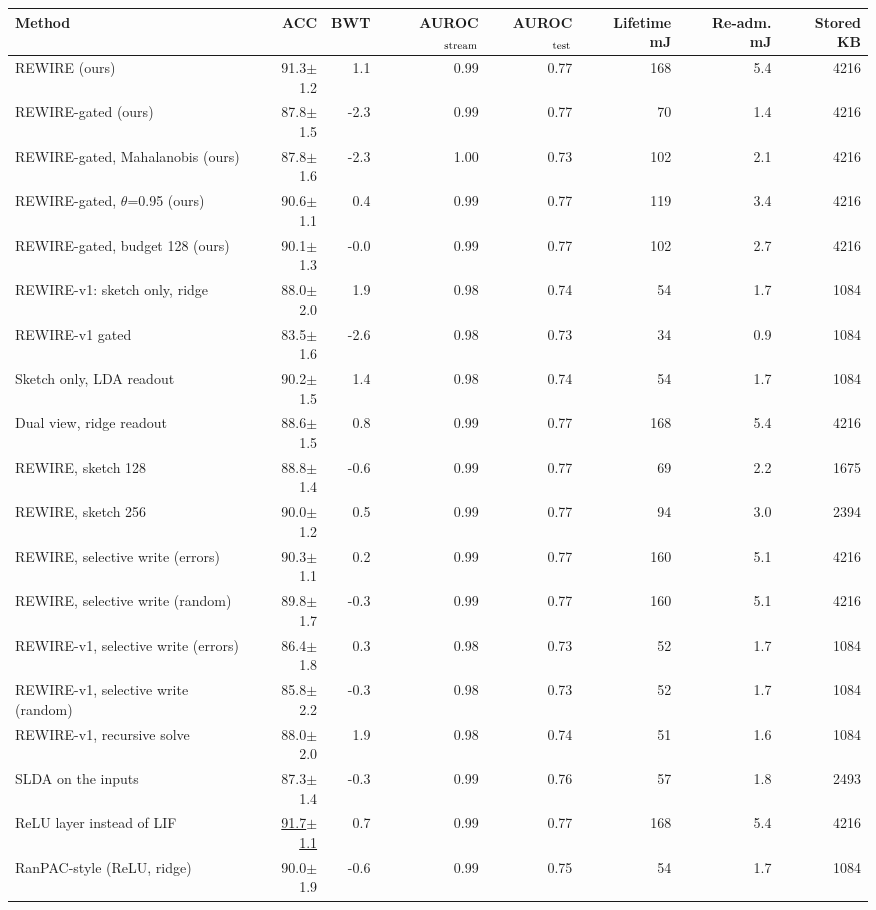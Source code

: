 \begin{tabular}{lrrrrrrr}
\toprule
Method & ACC & BWT & AUROC$_{\rm stream}$ & AUROC$_{\rm test}$ & Lifetime mJ & Re-adm. mJ & Stored KB \\
\midrule
REWIRE (ours) & 91.3{\tiny$\pm$1.2} & 1.1 & 0.99 & 0.77 & 168 & 5.4 & 4216 \\
REWIRE-gated (ours) & 87.8{\tiny$\pm$1.5} & -2.3 & 0.99 & 0.77 & 70 & 1.4 & 4216 \\
REWIRE-gated, Mahalanobis (ours) & 87.8{\tiny$\pm$1.6} & -2.3 & 1.00 & 0.73 & 102 & 2.1 & 4216 \\
REWIRE-gated, $\theta$=0.95 (ours) & 90.6{\tiny$\pm$1.1} & 0.4 & 0.99 & 0.77 & 119 & 3.4 & 4216 \\
REWIRE-gated, budget 128 (ours) & 90.1{\tiny$\pm$1.3} & -0.0 & 0.99 & 0.77 & 102 & 2.7 & 4216 \\
REWIRE-v1: sketch only, ridge & 88.0{\tiny$\pm$2.0} & 1.9 & 0.98 & 0.74 & 54 & 1.7 & 1084 \\
REWIRE-v1 gated & 83.5{\tiny$\pm$1.6} & -2.6 & 0.98 & 0.73 & 34 & 0.9 & 1084 \\
Sketch only, LDA readout & 90.2{\tiny$\pm$1.5} & 1.4 & 0.98 & 0.74 & 54 & 1.7 & 1084 \\
Dual view, ridge readout & 88.6{\tiny$\pm$1.5} & 0.8 & 0.99 & 0.77 & 168 & 5.4 & 4216 \\
REWIRE, sketch 128 & 88.8{\tiny$\pm$1.4} & -0.6 & 0.99 & 0.77 & 69 & 2.2 & 1675 \\
REWIRE, sketch 256 & 90.0{\tiny$\pm$1.2} & 0.5 & 0.99 & 0.77 & 94 & 3.0 & 2394 \\
REWIRE, selective write (errors) & 90.3{\tiny$\pm$1.1} & 0.2 & 0.99 & 0.77 & 160 & 5.1 & 4216 \\
REWIRE, selective write (random) & 89.8{\tiny$\pm$1.7} & -0.3 & 0.99 & 0.77 & 160 & 5.1 & 4216 \\
REWIRE-v1, selective write (errors) & 86.4{\tiny$\pm$1.8} & 0.3 & 0.98 & 0.73 & 52 & 1.7 & 1084 \\
REWIRE-v1, selective write (random) & 85.8{\tiny$\pm$2.2} & -0.3 & 0.98 & 0.73 & 52 & 1.7 & 1084 \\
REWIRE-v1, recursive solve & 88.0{\tiny$\pm$2.0} & 1.9 & 0.98 & 0.74 & 51 & 1.6 & 1084 \\
SLDA on the inputs & 87.3{\tiny$\pm$1.4} & -0.3 & 0.99 & 0.76 & 57 & 1.8 & 2493 \\
ReLU layer instead of LIF & \underline{91.7{\tiny$\pm$1.1}} & 0.7 & 0.99 & 0.77 & 168 & 5.4 & 4216 \\
RanPAC-style (ReLU, ridge) & 90.0{\tiny$\pm$1.9} & -0.6 & 0.99 & 0.75 & 54 & 1.7 & 1084 \\

\end{tabular}
